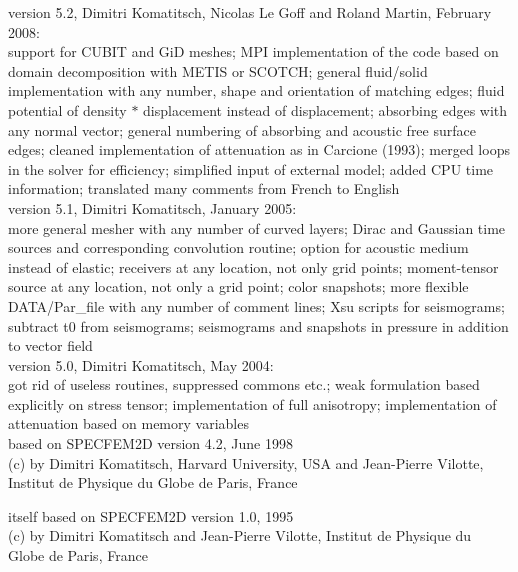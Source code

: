 version 5.2, Dimitri Komatitsch, Nicolas Le Goff and Roland Martin, February 2008:\\
support for CUBIT and GiD meshes;
MPI implementation of the code based on domain decomposition with METIS or SCOTCH;
general fluid/solid implementation with any number, shape and orientation of matching edges;
fluid potential of density $*$ displacement instead of displacement;
absorbing edges with any normal vector;
general numbering of absorbing and acoustic free surface edges;
cleaned implementation of attenuation as in Carcione (1993);
merged loops in the solver for efficiency;
simplified input of external model;
added CPU time information;
translated many comments from French to English\\

version 5.1, Dimitri Komatitsch, January 2005:\\
more general mesher with any number of curved layers;
Dirac and Gaussian time sources and corresponding convolution routine;
option for acoustic medium instead of elastic;
receivers at any location, not only grid points;
moment-tensor source at any location, not only a grid point;
color snapshots;
more flexible DATA/Par\_file with any number of comment lines;
Xsu scripts for seismograms;
subtract t0 from seismograms;
seismograms and snapshots in pressure in addition to vector field\\

version 5.0, Dimitri Komatitsch, May 2004:\\
got rid of useless routines, suppressed commons etc.;
weak formulation based explicitly on stress tensor;
implementation of full anisotropy;
implementation of attenuation based on memory variables\\

based on SPECFEM2D version 4.2, June 1998\\
(c) by Dimitri Komatitsch, Harvard University, USA
and Jean-Pierre Vilotte, Institut de Physique du Globe de Paris, France

itself based on SPECFEM2D version 1.0, 1995\\
(c) by Dimitri Komatitsch and Jean-Pierre Vilotte,
Institut de Physique du Globe de Paris, France


